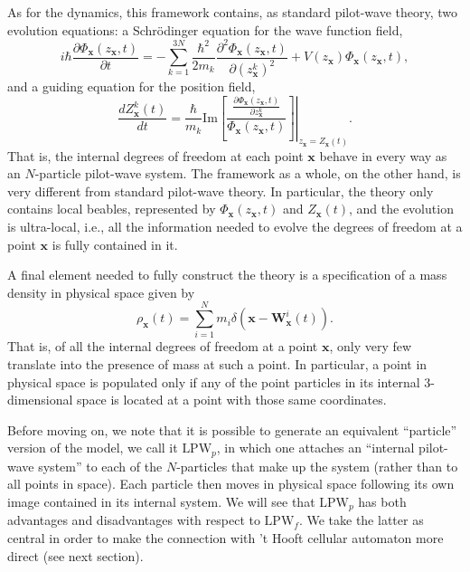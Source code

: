 \documentclass[letterpaper,12pt]{article}
\begin{document}
As for the dynamics, this framework contains, as standard pilot-wave theory, two evolution equations: a Schrödinger equation for the wave function field,
 \begin{equation}\label{M1}
 i \hbar \frac{\partial \Phi_\mathbf{x} (z_{\mathbf{x}},t)}{ \partial t } = - \sum_{k=1}^{3N} \frac{\hbar^2}{2 m_k} \frac{\partial^2 \Phi_\mathbf{x} (z_{\mathbf{x}},t)}{\partial (z^k_\mathbf{x})^2} + V(z_\mathbf{x})\Phi_\mathbf{x} (z_{\mathbf{x}},t) ,
 \end{equation}
and a guiding equation for the position field, 
\begin{equation}\label{M2}
\frac{d Z^k_\mathbf{x}(t)}{dt} = \frac{\hbar}{m_k} \left. \text{Im}\left[ \frac{\frac{\partial \Phi_\mathbf{x} (z_{\mathbf{x}},t)}{\partial z^k_\mathbf{x} }}{ \Phi_\mathbf{x} (z_{\mathbf{x}},t)} \right] \right\rvert_{z_\mathbf{x}=Z_\mathbf{x}(t)}.
\end{equation}
That is, the internal degrees of freedom at each point $\mathbf{x}$ behave in every way as an $N$-particle pilot-wave system. The framework as a whole, on the other hand, is very different from standard pilot-wave theory. In particular, the theory only contains local beables, represented by $\Phi_\mathbf{x}(z_{\mathbf{x}},t)$ and $Z_\mathbf{x}(t)$, and the evolution is ultra-local, i.e., all the information needed to evolve the degrees of freedom at a point $\mathbf{x}$ is fully contained in it.

A final element needed to fully construct the theory is a specification of a mass density in physical space given by
\begin{equation}\label{MD}
\rho_\mathbf{x}(t) = \sum_{i=1}^N m_i \delta \left(\mathbf{x}-\mathbf{W}_\mathbf{x}^i(t)\right).
 \end{equation}
That is, of all the internal degrees of freedom at a point $\mathbf{x}$, only very few translate into the presence of mass at such a point. In particular, a point in physical space is populated only if any of the point particles in its internal 3-dimensional space is located at a point with those same coordinates.

Before moving on, we note that it is possible to generate an equivalent ``particle'' version of the model, we call it $\text{LPW}_p$, in which one attaches an ``internal pilot-wave system'' to each of the $N$-particles that make up the system (rather than to all points in space). Each particle then moves in physical space following its own image contained in its internal system. We will see that $\text{LPW}_p$ has both advantages and disadvantages with respect to $\text{LPW}_f$. We take the latter as central in order to make the connection with 't Hooft cellular automaton more direct (see next section).
\end{document}
